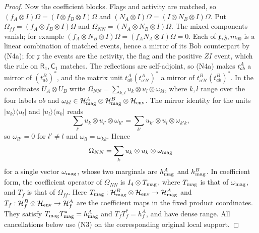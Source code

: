 \begin{proof}
Now the coefficient blocks. Flags and activity are matched, so $(f_A\otimes I)\Omega=(I\otimes f_B\otimes I)\Omega$ and $(N_A\otimes I)\Omega=(I\otimes N_B\otimes I)\Omega$. Put $\Omega_{ff}=(f_A\otimes f_B\otimes I)\Omega$ and $\Omega_{NN}=(N_A\otimes N_B\otimes I)\Omega$. The mixed components vanish; for example $(f_A\otimes N_B\otimes I)\Omega=(f_AN_A\otimes I)\Omega=0$. Each of $\mathfrak x,\mathfrak z,m_{00}$ is a linear combination of matched events, hence a mirror of its Bob counterpart by (N4a); for $\mathfrak x$ the events are the activity, the flag and the positive $ZI$ event, which the rule on $\mathsf R_1,\mathsf C_1$ matches. The reflections are self-adjoint, so (N4a) makes $t^A_{ab}$ a mirror of $(t^B_{ab})^*$, and the matrix unit $t^A_{ab}(t^A_{a'b'})^*$ a mirror of $t^B_{a'b'}(t^B_{ab})^*$. In the coordinates $U_A\otimes U_B$ write $\Omega_{NN}=\sum_{k,l}u_k\otimes u_l\otimes\omega_{kl}$, where $k,l$ range over the four labels $ab$ and $\omega_{kl}\in\mathcal H^A_{\rm mag}\otimes\mathcal H^B_{\rm mag}\otimes\mathcal H_{\rm env}$. The mirror identity for the units $|u_k\rangle\langle u_l|$ and $|u_l\rangle\langle u_k|$ reads
\[
 \sum_{l'}u_k\otimes u_{l'}\otimes\omega_{ll'}=\sum_{k'}u_{k'}\otimes u_l\otimes\omega_{k'k},
\]
so $\omega_{ll'}=0$ for $l'\ne l$ and $\omega_{ll}=\omega_{kk}$. Hence
\[
 \Omega_{NN}=\sum_ku_k\otimes u_k\otimes\omega_{\rm mag}
\]
for a single vector $\omega_{\rm mag}$, whose two marginals are $h^A_{\rm mag}$ and $h^B_{\rm mag}$. In coefficient form, the coefficient operator of $\Omega_{NN}$ is $I_4\otimes T_{\rm mag}$, where $T_{\rm mag}$ is that of $\omega_{\rm mag}$, and $T_f$ is that of $\Omega_{ff}$. Here $T_{\rm mag}:\mathcal H^B_{\rm mag}\otimes\mathcal H_{\rm env}
\to\mathcal H^A_{\rm mag}$ and
$T_f:\mathcal H^B_f\otimes\mathcal H_{\rm env}\to\mathcal H^A_f$
are the coefficient maps in the fixed product coordinates.
They satisfy $T_{\rm mag}T_{\rm mag}^*=h^A_{\rm mag}$ and $T_fT_f^*=h^A_f$, and have dense range. All cancellations below use (N3) on the corresponding original local support.


\end{proof}
